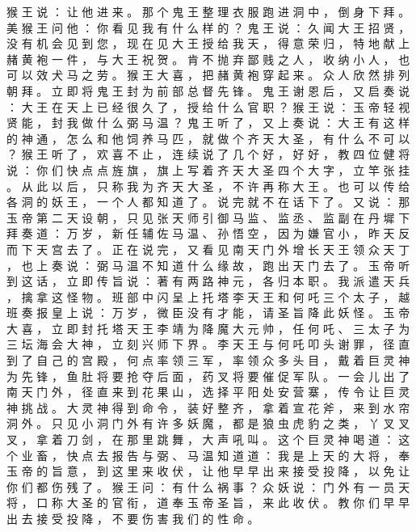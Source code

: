{猴 王 说 ： 让 他 进 来 。
那 个 鬼 王 整 理 衣 服 跑 进 洞 中 ， 倒 身 下 拜 。
美 猴 王 问 他 ： 你 看 见 我 有 什 么 样 的 ？ 鬼 王 说 ： 久 闻 大 王 招 贤 ， 没 有 机 会 见 到 您 ， 现 在 见 大 王 授 给 我 天 ， 得 意 荣 归 ， 特 地 献 上 赭 黄 袍 一 件 ， 与 大 王 祝 贺 。
肯 不 抛 弃 鄙 贱 之 人 ， 收 纳 小 人 ， 也 可 以 效 犬 马 之 劳 。
猴 王 大 喜 ， 把 赭 黄 袍 穿 起 来 。
众 人 欣 然 排 列 朝 拜 。
立 即 将 鬼 王 封 为 前 部 总 督 先 锋 。
鬼 王 谢 恩 后 ， 又 启 奏 说 ： 大 王 在 天 上 已 经 很 久 了 ， 授 给 什 么 官 职 ？ 猴 王 说 ： 玉 帝 轻 视 贤 能 ， 封 我 做 什 么 弼 马 温 ？
鬼 王 听 了 ， 又 上 奏 说 ： 大 王 有 这 样 的 神 通 ， 怎 么 和 他 饲 养 马 匹 ， 就 做 个 齐 天 大 圣 ， 有 什 么 不 可 以 ？ 猴 王 听 了 ， 欢 喜 不 止 ， 连 续 说 了 几 个 好 ， 好 好 ， 教 四 位 健 将 说 ： 你 们 快 点 点 旌 旗 ， 旗 上 写 着 齐 天 大 圣 四 个 大 字 ， 立 竿 张 挂 。
从 此 以 后 ， 只 称 我 为 齐 天 大 圣 ， 不 许 再 称 大 王 。
也 可 以 传 给 各 洞 的 妖 王 ， 一 个 人 都 知 道 了 。
说 完 就 不 在 话 下 了 。
又 说 ： 那 玉 帝 第 二 天 设 朝 ， 只 见 张 天 师 引 御 马 监 、 监 丞 、 监 副 在 丹 墀 下 拜 奏 道 ： 万 岁 ， 新 任 辅 佐 马 温 、 孙 悟 空 ， 因 为 嫌 官 小 ， 昨 天 反 而 下 天 宫 去 了 。
正 在 说 完 ， 又 看 见 南 天 门 外 增 长 天 王 领 众 天 丁 ， 也 上 奏 说 ： 弼 马 温 不 知 道 什 么 缘 故 ， 跑 出 天 门 去 了 。
玉 帝 听 到 这 话 ， 立 即 传 旨 说 ： 著 有 两 路 神 元 ， 各 归 本 职 。
我 派 遣 天 兵 ， 擒 拿 这 怪 物 。
班 部 中 闪 呈 上 托 塔 李 天 王 和 何 吒 三 个 太 子 ， 越 班 奏 报 皇 上 说 ： 万 岁 ， 微 臣 没 有 才 能 ， 请 圣 旨 降 此 妖 怪 。
玉 帝 大 喜 ， 立 即 封 托 塔 天 王 李 靖 为 降 魔 大 元 帅 ， 任 何 吒 、 三 太 子 为 三 坛 海 会 大 神 ， 立 刻 兴 师 下 界 。
李 天 王 与 何 吒 叩 头 谢 罪 ， 径 直 到 了 自 己 的 宫 殿 ， 何 点 率 领 三 军 ， 率 领 众 多 头 目 ， 戴 着 巨 灵 神 为 先 锋 ， 鱼 肚 将 要 抢 夺 后 面 ， 药 叉 将 要 催 促 军 队 。
一 会 儿 出 了 南 天 门 外 ， 径 直 来 到 花 果 山 ， 选 择 平 阳 处 安 营 寨 ， 传 令 让 巨 灵 神 挑 战 。
大 灵 神 得 到 命 令 ， 装 好 整 齐 ， 拿 着 宣 花 斧 ， 来 到 水 帘 洞 外 。
只 见 小 洞 门 外 有 许 多 妖 魔 ， 都 是 狼 虫 虎 豹 之 类 ， 丫 叉 叉 叉 ， 拿 着 刀 剑 ， 在 那 里 跳 舞 ， 大 声 吼 叫 。
这 个 巨 灵 神 喝 道 ： 这 个 业 畜 ， 快 点 去 报 告 与 弼 、 马 温 知 道 道 ： 我 是 上 天 的 大 将 ， 奉 玉 帝 的 旨 意 ， 到 这 里 来 收 伏 ， 让 他 早 早 出 来 接 受 投 降 ， 以 免 让 你 们 都 伤 残 了 。
猴 王 问 ： 有 什 么 祸 事 ？ 众 妖 说 ： 门 外 有 一 员 天 将 ， 口 称 大 圣 的 官 衔 ， 道 奉 玉 帝 圣 旨 ， 来 此 收 伏 。
教 你 们 早 早 出 去 接 受 投 降 ， 不 要 伤 害 我 们 的 性 命 。
}

